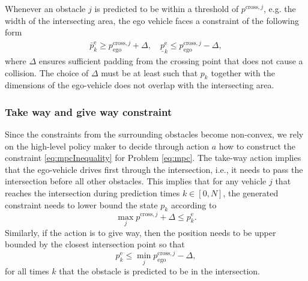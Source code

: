 Whenever an obstacle $j$ is predicted to be within a threshold of $p^{\mathrm{cross},j}$, e.g. the width of the intersecting area, the ego vehicle faces a constraint of the following form
\begin{gather*}
\bar{p}_k^\mathrm{e} \geq{} p^{\mathrm{cross},j}_\mathrm{ego} + \Delta,\quad\underline{p}_k^\mathrm{e} \leq{} p^{\mathrm{cross},j}_\mathrm{ego} - \Delta,
\end{gather*}
where $\Delta$ ensures sufficient padding from the crossing point that does not cause a collision. The choice of $\Delta$ must be at least such that $p_k$ together with the dimensions of the ego-vehicle does not overlap with the intersecting area.

\subsubsection{Take way and give way constraint}
Since the constraints from the surrounding obstacles become non-convex, we rely on the high-level policy maker to decide through action $a$ how to construct the constraint \eqref{eq:mpcInequality} for Problem \eqref{eq:mpc}. The take-way action implies that the ego-vehicle drives first through the intersection, i.e., it needs to pass the intersection before all other obstacles. This implies that for any vehicle $j$ that reaches the intersection during prediction times $k\in[0,N]$, the generated constraint needs to lower bound the state $p_k$ according to
\begin{equation}
\max_{j}p^{\mathrm{cross},j}+\Delta \leq{}p_k^\mathrm{e}.
\end{equation}
Similarly, if the action is to give way, then the position needs to be upper bounded by the closest intersection point so that
\begin{equation}
p_k^\mathrm{e} \leq{} \min_{j}p^{\mathrm{cross},j}_\mathrm{ego}-\Delta,
\end{equation} 
for all times $k$ that the obstacle is predicted to be in the intersection.

